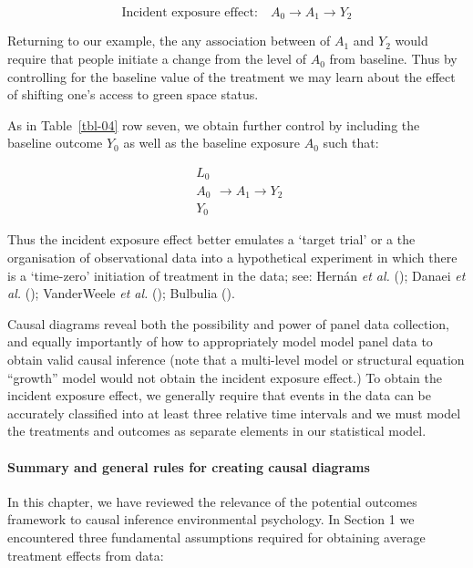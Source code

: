 \documentclass[
  singlecolumn]{article}
\let\oldparagraph\paragraph
\renewcommand{\paragraph}[1]{\oldparagraph{#1}\mbox{}}
\begin{document}
\[
\text{Incident exposure effect:} \quad \boxed{A_{0}} \to A_{1} \to Y_{2}
\]

Returning to our example, the any association between of \(A_1\) and
\(Y_2\) would require that people initiate a change from the level of
\(A_0\) from baseline. Thus by controlling for the baseline value of the
treatment we may learn about the effect of shifting one's access to
green space status.

As in Table~\ref{tbl-04} row seven, we obtain further control by
including the baseline outcome \(Y_0\) as well as the baseline exposure
\(A_0\) such that:

\[
\boxed{
\begin{aligned}
L_{0} \\
A_{0} \\
Y_{0}
\end{aligned}
}
\to A_{1} \to Y_{2}
\]

Thus the incident exposure effect better emulates a `target trial' or a
the organisation of observational data into a hypothetical experiment in
which there is a `time-zero' initiation of treatment in the data; see:
Hernán \emph{et al.} (); Danaei
\emph{et al.} (); VanderWeele \emph{et
al.} (); Bulbulia
().

Causal diagrams reveal both the possibility and power of panel data
collection, and equally importantly of how to appropriately model model
panel data to obtain valid causal inference (note that a multi-level
model or structural equation ``growth'' model would not obtain the
incident exposure effect.) To obtain the incident exposure effect, we
generally require that events in the data can be accurately classified
into at least three relative time intervals and we must model the
treatments and outcomes as separate elements in our statistical model.

\paragraph{Summary and general rules for creating causal
diagrams}\label{summary-and-general-rules-for-creating-causal-diagrams}

In this chapter, we have reviewed the relevance of the potential
outcomes framework to causal inference environmental psychology. In
Section 1 we encountered three fundamental assumptions required for
obtaining average treatment effects from data:
\end{document}
